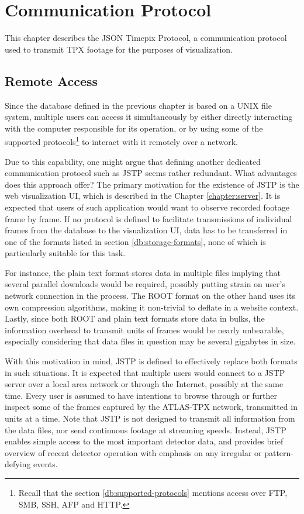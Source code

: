 \chapter{Communication Protocol}
\label{protocol:introduction}
This chapter describes the JSON Timepix Protocol, a communication protocol used to transmit TPX footage for the purposes of visualization.

\section{Remote Access}
Since the database defined in the previous chapter is based on a UNIX file system, multiple users can access it simultaneously by either directly interacting with the computer responsible for its operation, or by using some of the supported protocols\footnote{Recall that the section \ref{db:supported-protocols} mentions access over FTP, SMB, SSH, AFP and HTTP.} to interact with it remotely over a network.

Due to this capability, one might argue that defining another dedicated communication protocol such as JSTP seems rather redundant. What advantages does this approach offer? The primary motivation for the existence of JSTP is the web visualization UI, which is described in the Chapter \ref{chapter:server}. It is expected that users of such application would want to observe recorded footage frame by frame. If no protocol is defined to facilitate transmissions of individual frames from the database to the visualization UI, data has to be transferred in one of the formats listed in section \ref{db:storage-formats}, none of which is particularly suitable for this task.

For instance, the plain text format stores data in multiple files implying that several parallel downloads would be required, possibly putting strain on user's network connection in the process. The ROOT format on the other hand uses its own compression algorithms, making it non-trivial to deflate in a website context. Lastly, since both ROOT and plain text formats store data in bulks, the information overhead to transmit units of frames would be nearly unbearable, especially considering that data files in question may be several gigabytes in size.

With this motivation in mind, JSTP is defined to effectively replace both formats in such situations. It is expected that multiple users would connect to a JSTP server over a local area network or through the Internet, possibly at the same time. Every user is assumed to have intentions to browse through or further inspect some of the frames captured by the ATLAS-TPX network, transmitted in units at a time. Note that JSTP is not designed to transmit all information from the data files, nor send continuous footage at streaming speeds. Instead, JSTP enables simple access to the most important detector data, and provides brief overview of recent detector operation with emphasis on any irregular or pattern-defying events.

